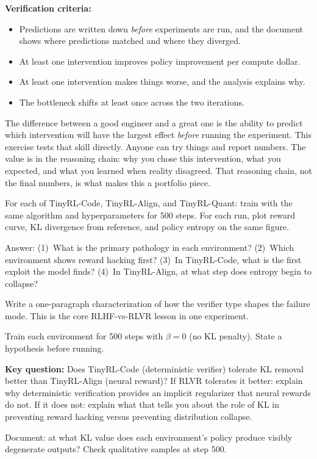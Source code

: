 \begin{portfolio}
\textbf{Verification criteria:}
\begin{itemize}
  \item Predictions are written down \textit{before} experiments are run, and the document shows where predictions matched and where they diverged.
  \item At least one intervention improves policy improvement per compute dollar.
  \item At least one intervention makes things worse, and the analysis explains why.
  \item The bottleneck shifts at least once across the two iterations.
\end{itemize}
\end{portfolio}

\begin{taste}
The difference between a good engineer and a great one is the ability to predict which intervention will have the largest effect \textit{before} running the experiment. This exercise tests that skill directly. Anyone can try things and report numbers. The value is in the reasoning chain: why you chose this intervention, what you expected, and what you learned when reality disagreed. That reasoning chain, not the final numbers, is what makes this a portfolio piece.
\end{taste}


\begin{exercise}
For each of TinyRL-Code, TinyRL-Align, and TinyRL-Quant: train with the same algorithm and hyperparameters for 500 steps. For each run, plot reward curve, KL divergence from reference, and policy entropy on the same figure.

Answer: (1)~What is the primary pathology in each environment? (2)~Which environment shows reward hacking first? (3)~In TinyRL-Code, what is the first exploit the model finds? (4)~In TinyRL-Align, at what step does entropy begin to collapse?

Write a one-paragraph characterization of how the verifier type shapes the failure mode. This is the core RLHF-vs-RLVR lesson in one experiment.
\end{exercise}

\begin{exercise}
Train each environment for 500 steps with $\beta = 0$ (no KL penalty). State a hypothesis before running.

\textbf{Key question:} Does TinyRL-Code (deterministic verifier) tolerate KL removal better than TinyRL-Align (neural reward)? If RLVR tolerates it better: explain why deterministic verification provides an implicit regularizer that neural rewards do not. If it does not: explain what that tells you about the role of KL in preventing reward hacking versus preventing distribution collapse.

Document: at what KL value does each environment's policy produce visibly degenerate outputs? Check qualitative samples at step 500.
\end{exercise}

